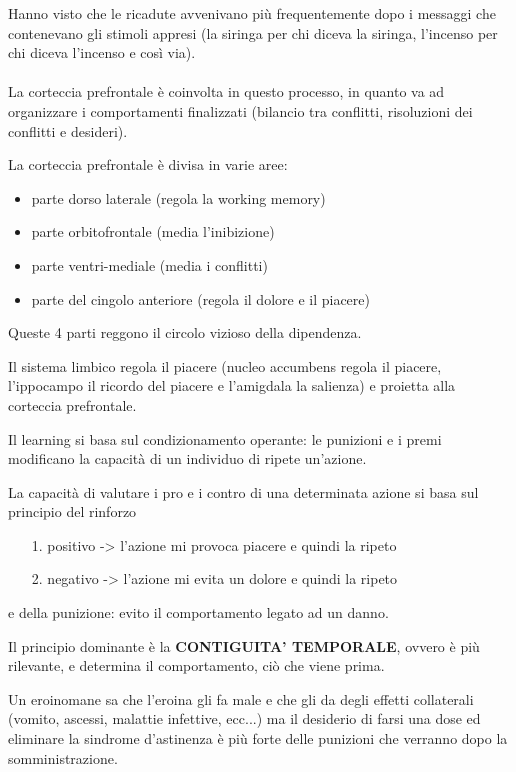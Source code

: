 Hanno visto che le ricadute avvenivano più frequentemente dopo i
messaggi che contenevano gli stimoli appresi (la siringa per chi diceva
la siringa, l'incenso per chi diceva l'incenso e così via).
\\\\
La corteccia prefrontale è coinvolta in questo processo, in quanto va ad
organizzare i comportamenti finalizzati (bilancio tra conflitti,
risoluzioni dei conflitti e desideri).

La corteccia prefrontale è divisa in varie aree:

\begin{itemize}
\item
  parte dorso laterale (regola la working memory)
\item
  parte orbitofrontale (media l'inibizione)

\item
  parte ventri-mediale (media i conflitti)
\item
  parte del cingolo anteriore (regola il dolore e il piacere)
\end{itemize}

Queste 4 parti reggono il circolo vizioso della dipendenza.

Il sistema limbico regola il piacere (nucleo accumbens regola il
piacere, l'ippocampo il ricordo del piacere e l'amigdala la salienza) e
proietta alla corteccia prefrontale.

Il learning si basa sul condizionamento operante: le punizioni e i premi
modificano la capacità di un individuo di ripete un'azione.

La capacità di valutare i pro e i contro di una determinata azione si
basa sul principio del rinforzo

\begin{itemize}
\item[1.]
  positivo -> l'azione mi provoca piacere e quindi la ripeto
\item[2.]  
  negativo -> l'azione mi evita un dolore e quindi la ripeto  
\end{itemize}

e della punizione: evito il comportamento legato ad un danno.

Il principio dominante è la \textbf{CONTIGUITA' TEMPORALE}, ovvero è più
rilevante, e determina il comportamento, ciò che viene prima.

Un eroinomane sa che l'eroina gli fa male e che gli da degli effetti
collaterali (vomito, ascessi, malattie infettive, ecc...) ma il
desiderio di farsi una dose ed eliminare la sindrome d'astinenza è più
forte delle punizioni che verranno dopo la somministrazione.

